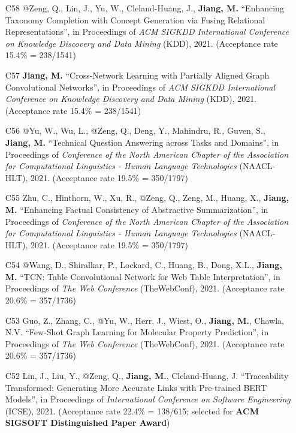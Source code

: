 \documentclass[10pt]{article}
\newenvironment{myindentpar}[1]%
{\begin{list}{}%
         {\setlength{\leftmargin}{#1}}%
         \item[]%
}
{\end{list}}
\newcounter{list}
\begin{document}
\begin{myindentpar}{0.00cm}
\begin{enumerate}[leftmargin=.5cm]
\item[C58] @Zeng, Q., Lin, J., Yu, W., Cleland-Huang, J., \textbf{Jiang, M.} ``Enhancing Taxonomy Completion with Concept Generation via Fusing Relational Representations'', in Proceedings of \textit{ACM SIGKDD International Conference on Knowledge Discovery and Data Mining} (KDD), 2021. (Acceptance rate 15.4\% = 238/1541)

\item[C57] \textbf{Jiang, M.} ``Cross-Network Learning with Partially Aligned Graph Convolutional Networks'', in Proceedings of \textit{ACM SIGKDD International Conference on Knowledge Discovery and Data Mining} (KDD), 2021. (Acceptance rate 15.4\% = 238/1541)	

\item[C56] @Yu, W., Wu, L., @Zeng, Q., Deng, Y., Mahindru, R., Guven, S., \textbf{Jiang, M.} ``Technical Question Answering across Tasks and Domains'', in Proceedings of \textit{Conference of the North American Chapter of the Association for Computational Linguistics - Human Language Technologies} (NAACL-HLT), 2021. (Acceptance rate 19.5\% = 350/1797)

\item[C55] Zhu, C., Hinthorn, W., Xu, R., @Zeng, Q., Zeng, M., Huang, X., \textbf{Jiang, M.} ``Enhancing Factual Consistency of Abstractive Summarization'', in Proceedings of \textit{Conference of the North American Chapter of the Association for Computational Linguistics - Human Language Technologies} (NAACL-HLT), 2021. (Acceptance rate 19.5\% = 350/1797)

\item[C54] @Wang, D., Shiralkar, P., Lockard, C., Huang, B., Dong, X.L., \textbf{Jiang, M.} ``TCN: Table Convolutional Network for Web Table Interpretation'', in Proceedings of \textit{The Web Conference} (TheWebConf), 2021. (Acceptance rate 20.6\% = 357/1736)

\item[C53] Guo, Z., Zhang, C., @Yu, W., Herr, J., Wiest, O., \textbf{Jiang, M.}, Chawla, N.V. ``Few-Shot Graph Learning for Molecular Property Prediction'', in Proceedings of \textit{The Web Conference} (TheWebConf), 2021. (Acceptance rate 20.6\% = 357/1736)

\item[C52] Lin, J., Liu, Y., @Zeng, Q., \textbf{Jiang, M.}, Cleland-Huang, J. ``Traceability Transformed: Generating More Accurate Links with Pre-trained BERT Models'', in Proceedings of \textit{International Conference on Software Engineering} (ICSE), 2021. (Acceptance rate 22.4\% = 138/615; selected for \textbf{ACM SIGSOFT Distinguished Paper Award})


\end{enumerate}
\end{myindentpar}
\end{document}
